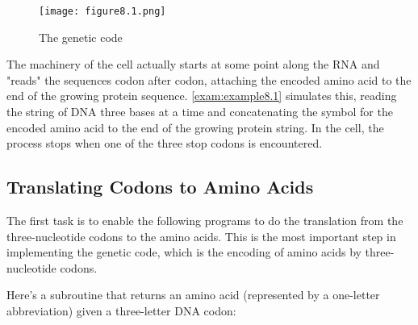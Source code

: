 \begin{figure}
  \centering
  \texttt{[image: figure8.1.png]}
  \caption{The genetic code}
  \label{fig:figure8.1}
\end{figure}

The machinery of the cell actually starts at some point along the RNA and "reads" the sequences codon after codon, attaching the encoded amino acid to the end of the growing protein sequence.  \autoref{exam:example8.1} simulates this, reading the string of DNA three bases at a time and concatenating the symbol for the encoded amino acid to the end of the growing protein string. In the cell, the process stops when one of the three stop codons is encountered. 

\subsection{Translating Codons to Amino Acids}
The first task is to enable the following programs to do the translation from the three-nucleotide codons to the amino acids. This is the most important step in implementing the genetic code, which is the encoding of amino acids by three-nucleotide codons.

Here's a subroutine that returns an amino acid (represented by a one-letter abbreviation) given a three-letter DNA codon: 

